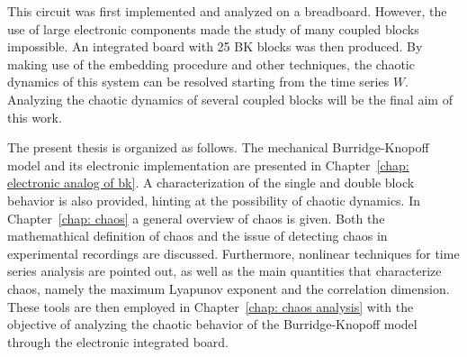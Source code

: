 This circuit was first implemented and analyzed on a breadboard. However, the use of large electronic
components made the study of many coupled blocks impossible. An integrated board with 25 BK blocks
was then produced. By making use of the embedding procedure and other techniques, the chaotic dynamics
of this system can be resolved starting from the time series $W$. Analyzing the chaotic dynamics of
several coupled blocks will be the final aim of this work.

The present thesis is organized as follows. The mechanical Burridge-Knopoff model and its electronic
implementation are presented in Chapter~\ref{chap: electronic analog of bk}. A characterization of the
single and double block behavior is also provided, hinting at the possibility of chaotic dynamics.
In Chapter~\ref{chap: chaos} a general overview of chaos is given. Both the mathemathical definition
of chaos and the issue of detecting chaos in experimental recordings are discussed. Furthermore,
nonlinear techniques for time series analysis are pointed out, as well as the main quantities that
characterize chaos, namely the maximum Lyapunov exponent and the correlation dimension.
These tools are then employed in Chapter~\ref{chap: chaos analysis} with the objective of analyzing
the chaotic behavior of the Burridge-Knopoff model through the electronic integrated board.














